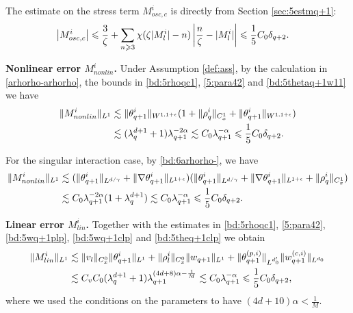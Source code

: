 \documentclass[10pt,a4paper]{amsart}
\numberwithin{equation}{section}
\def\geq{\geqslant}
\def\leq{\leqslant}
\def\geq{\geqslant}
\def\leq{\leqslant}
\begin{document}
The estimate on  the stress term $M^i_{osc,c}$ is directly from Section \ref{sec:5estmq+1}:
\begin{align}
     \left| M^i_{osc,c} \right|%
     &\leq \frac{3}{\zeta }+\sum_{n\geq3}\chi(\zeta |M^i_l |-n)\left|\frac{n}{\zeta }- |M^i_l |\right|\leq  \frac15C_0\delta_{q+2}.\notag
\end{align}

 

\textbf{Nonlinear error $M^i_{nonlin} $.} Under Assumption \ref{def:ass}, by the calculation in \eqref{arhorho-arhorho},   the bounds in   \eqref{bd:5rhoqc1}, \eqref{5:para42} and \eqref{bd:5thetaq+1w11}  we have
\begin{align}
    \|M^i_{nonlin}\|_{L^1} 
      &\lesssim \|\theta^{i}_{q+1}\|_{W^{1,1+\epsilon}} (1+\|\rho^{i}_{q}\|_{C_{x}^1}+\| \theta_{q+1}^i\|_{W^{1,1+\epsilon}} ) \notag\\
      &\lesssim (\lambda_{q}^{ d+1}+1)\lambda_{q+1}^{-2\alpha} \lesssim    C_0 \lambda_{q+1}^{-\alpha}\leq \frac{1}{5}C_0 \delta_{q+2}.\notag
\end{align} 

For the singular interaction case, by \eqref{bd:6arhorho-},  we have
\begin{align*}
    \|M^i_{nonlin}\|_{L^1} 
     &\lesssim (\| \theta_{q+1}^i \|_{L^{d/\gamma}}+\|  \nabla \theta_{q+1}^i\|_{L^{1+\epsilon}})(\| \theta_{q+1}^i \|_{L^{d/\gamma}}+\|  \nabla \theta_{q+1}^i\|_{L^{1+\epsilon}}+\| \rho_q^i\|_{C_{x}^1}) \\
     &\lesssim C_0\lambda_{q+1}^{-2\alpha}(1+\lambda_q^{d+1})\lesssim    C_0 \lambda_{q+1}^{-\alpha}\leq \frac{1}{5}C_0 \delta_{q+2}.\notag
\end{align*}

\textbf{Linear error $M^i_{lin}$.} 
Together with  the estimates  
in \eqref{bd:5rhoqc1}, \eqref{5:para42},  \eqref{bd:5wq+1plp},  \eqref{bd:5wq+1clp} and   \eqref{bd:5theq+1clp}     we obtain
\begin{align}
 \|M^i_{lin}\|_{L^1}&\lesssim \|v_l\|_ {C_{x}^0}\|\theta^i_{q+1} \|_{L^1}+\|  \rho^i_l\|_ {C_{x}^0}
\|w_{q+1}\|_{L^1}+   \| \theta_{q+1}^{(p,i)}\|_{L^{d_0'}}\|w_{q+1}^{(c,i)}\|_{L^{d_0}}\notag\\
&\lesssim C_vC_0(\lambda_{q}^{ d+1}+1)\lambda_{q+1}^{(4d+8)\alpha-\frac1{M}}
\lesssim   C_0 \lambda_{q+1}^{-\alpha}\leq  \frac{1}{5}C_0 \delta_{q+2},\notag
\end{align}
where we used the   conditions on the parameters to have $(4d+10)\alpha<\frac{1}{M}$. 
\end{document}
